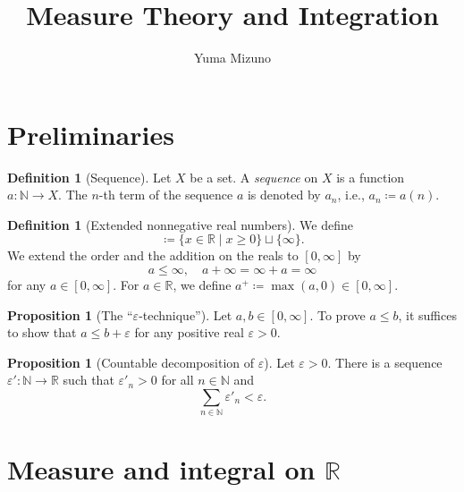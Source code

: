 \documentclass{article}
\theoremstyle{definition}
\newtheorem{proposition}[theorem]{Proposition}
\newtheorem{definition}[theorem]{Definition}
\begin{document}
\title{Measure Theory and Integration}
\author{Yuma Mizuno}
\maketitle

\section{Preliminaries}

\begin{definition}[Sequence]
  Let $X$ be a set.
  A \emph{sequence} on $X$ is a function $a : \mathbb{N} \to X$.
  The $n$-th term of the sequence $a$ is denoted by $a_n$, i.e., $a_n \coloneqq a(n)$.
\end{definition}

\begin{definition}[Extended nonnegative real numbers]
  We define 
  \begin{equation*}
    [0, \infty] \coloneqq \{ x \in \mathbb{R} \mid x \geq 0 \} \sqcup \{ \infty \}.
  \end{equation*}
  We extend the order and the addition on the reals to $[0, \infty]$ by
  \begin{equation*}
    a \leq \infty,\quad
    a + \infty = \infty + a = \infty
  \end{equation*}
  for any $a \in [0, \infty]$.
  For $a \in \mathbb{R}$,
  we define $a^+ \coloneqq \max (a, 0) \in [0, \infty]$.
\end{definition}

\begin{proposition}[The ``$\varepsilon$-technique'']
  Let $a,b\in[0,\infty]$.
  To prove $a\le b$, it suffices to show that 
  $a\le b+\varepsilon$
  for any positive real $\varepsilon > 0$.
\end{proposition}

\begin{proposition}[Countable decomposition of $\varepsilon$]
  Let $\varepsilon > 0$.
  There is a sequence $\varepsilon' : \mathbb{N} \to \mathbb{R}$ such that
  $\varepsilon'_n >0$ for all $n \in \mathbb{N}$ and
  \begin{equation*}
    \sum_{n \in \mathbb{N}} \varepsilon'_n < \varepsilon.
  \end{equation*}
\end{proposition}

\section{Measure and integral on $\mathbb{R}$}
\end{document}
